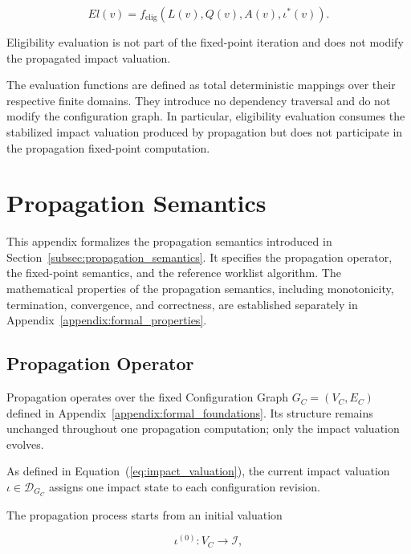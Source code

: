 \documentclass[10pt]{article}
\begin{document}
\begin{equation}
	El(v)
	=
	f_{\mathrm{elig}}
	\left(
	L(v),
	Q(v),
	A(v),
	\iota^{*}(v)
	\right).
	\label{eq:eligibility_from_fixed_impact}
\end{equation}

Eligibility evaluation is not part of the fixed-point iteration and does not modify the propagated impact valuation.

The evaluation functions are defined as total deterministic mappings over their respective finite domains. They introduce no dependency traversal and do not modify the configuration graph. In particular, eligibility evaluation consumes the stabilized impact valuation produced by propagation but does not participate in the propagation fixed-point computation.

\section{Propagation Semantics}
\label{appendix:propagation_semantics}

This appendix formalizes the propagation semantics introduced in
Section~\ref{subsec:propagation_semantics}. It specifies the propagation operator, the fixed-point semantics, and the reference worklist algorithm.
The mathematical properties of the propagation semantics, including monotonicity, termination, convergence, and correctness, are established separately in Appendix~\ref{appendix:formal_properties}.

\subsection{Propagation Operator}

Propagation operates over the fixed Configuration Graph
$G_C=(V_C,E_C)$ defined in Appendix~\ref{appendix:formal_foundations}.
Its structure remains unchanged throughout one propagation computation; only the impact valuation evolves.

As defined in Equation~(\ref{eq:impact_valuation}), the current impact valuation $\iota\in\mathcal D_{G_C}$ assigns one impact state to each configuration revision.

The propagation process starts from an initial valuation

\begin{equation}
	\iota^{(0)} : V_C \rightarrow \mathcal{I},
	\label{eq:initial_impact_valuation}
\end{equation}
\end{document}
